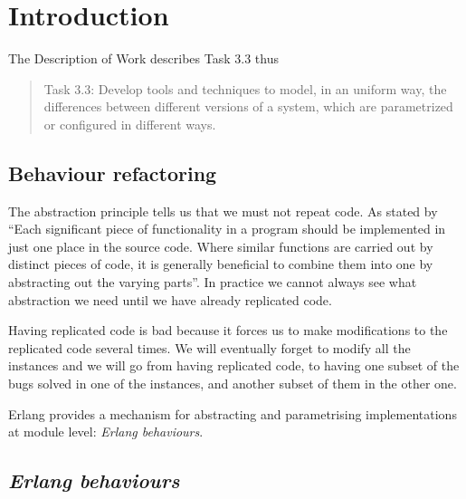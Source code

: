 \section{Introduction}

The Description of Work describes Task 3.3 thus
\begin{quote}
Task 3.3: Develop tools and techniques to model, in an uniform way, the differences between different versions of
a system, which are parametrized or configured in different ways.
\end{quote}

\subsection{Behaviour refactoring}

The abstraction principle tells us that we must not repeat code. As
stated by \cite{pierce2002types} ``Each significant piece of functionality
in a program should be implemented in just one place in the source
code. Where similar functions are carried out by distinct pieces of
code, it is generally beneficial to combine them into one by abstracting
out the varying parts''. In practice we cannot always see what abstraction
we need until we have already replicated code. 

Having replicated code is bad because it forces us to make modifications
to the replicated code several times. We will eventually forget to
modify all the instances and we will go from having replicated code,
to having one subset of the bugs solved in one of the instances, and
another subset of them in the other one.

Erlang provides a mechanism for abstracting and parametrising implementations
at module level: \emph{Erlang behaviours}.

\subsection{\emph{Erlang behaviours}\label{sec:erlang_behaviours}}

